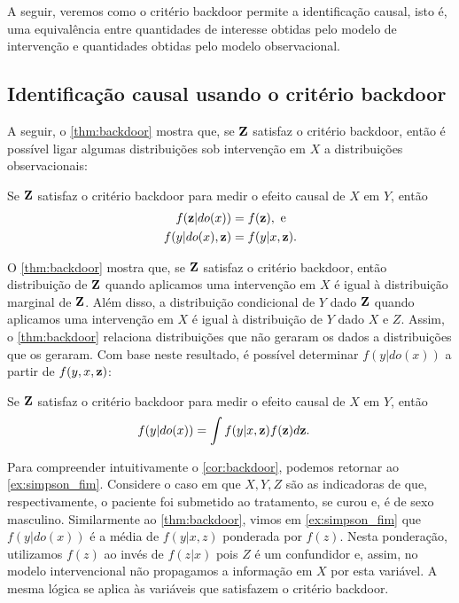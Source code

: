 A seguir, veremos como o critério backdoor permite
a identificação causal, isto é,
uma equivalência entre quantidades de interesse
obtidas pelo modelo de intervenção e
quantidades obtidas pelo modelo observacional.

\subsection{Identificação causal usando o critério backdoor}

A seguir, o \cref{thm:backdoor} mostra que,
se ${\mathbf{Z}}$ satisfaz o critério backdoor, então
é possível ligar algumas 
distribuições sob intervenção em $X$ a
distribuições observacionais:

\begin{theorem}
 \label{thm:backdoor}
 Se ${\mathbf{Z}}$ satisfaz 
 o critério backdoor para medir
 o efeito causal de $X$ em $Y$, então
 \begin{align*}
  f({\mathbf{z}}|do(x)) 
  &= f({\mathbf{z}}), \text{ e } \\
  f(y|do(x), {\mathbf{z}}) 
  &= f(y|x, {\mathbf{z}}).
 \end{align*}
\end{theorem}

O \cref{thm:backdoor} mostra que,
se ${\mathbf{Z}}$ satisfaz o critério backdoor, então
distribuição de ${\mathbf{Z}}$ quando
aplicamos uma intervenção em $X$ é igual
à distribuição marginal de ${\mathbf{Z}}$.
Além disso, a distribuição condicional de
$Y$ dado ${\mathbf{Z}}$ quando aplicamos uma intervenção em $X$ é igual 
à distribuição de $Y$ dado $X$ e $Z$.
Assim, o \cref{thm:backdoor} relaciona
distribuições que não geraram os dados a 
distribuições que os geraram.
Com base neste resultado, é possível determinar
$f(y|do(x))$ a partir de $f(y,x,{\mathbf{z}})$:

\begin{corollary}
 \label{cor:backdoor}
 Se ${\mathbf{Z}}$ satisfaz 
 o critério backdoor para medir
 o efeito causal de $X$ em $Y$, então
 \begin{align*}
  f(y|do(x)) &=
  \int f(y|x,{\mathbf{z}})f({\mathbf{z}})d{\mathbf{z}}.
 \end{align*}
\end{corollary}

Para compreender intuitivamente o \cref{cor:backdoor},
podemos retornar ao \cref{ex:simpson_fim}.
Considere o caso em que $X, Y, Z$ são as indicadoras de que,
respectivamente, o paciente foi submetido ao tratamento,
se curou e, é de sexo masculino.
Similarmente ao \cref{thm:backdoor},
vimos em \cref{ex:simpson_fim} que $f(y|do(x))$ é
a média de $f(y|x,z)$ ponderada por $f(z)$.
Nesta ponderação, utilizamos $f(z)$ 
ao invés de $f(z|x)$ pois $Z$ é um confundidor e,
assim, no modelo intervencional não propagamos
a informação em $X$ por esta variável.
A mesma lógica se aplica 
às variáveis que satisfazem o critério backdoor.


